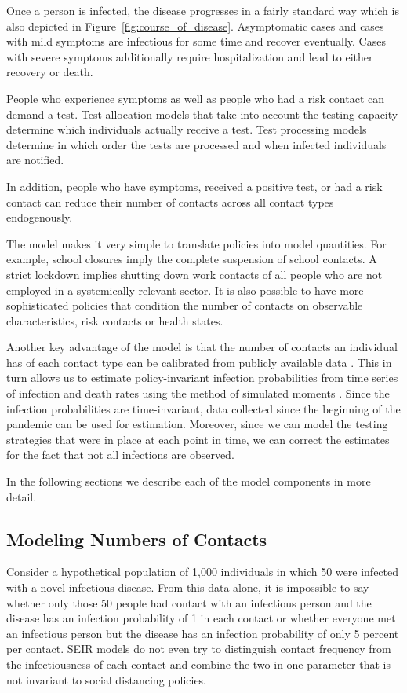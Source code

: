 Once a person is infected, the disease progresses in a fairly standard way which is also depicted in Figure~\ref{fig:course_of_disease}. Asymptomatic cases and cases with mild symptoms are infectious for some time and recover eventually. Cases with severe symptoms additionally require hospitalization and lead to either recovery or death.

People who experience symptoms as well as people who had a risk contact can demand a test. Test allocation models that take into account the testing capacity determine which individuals actually receive a test. Test processing models determine in which order the tests are processed and when infected individuals are notified.

In addition, people who have symptoms, received a positive test, or had a risk contact can reduce their number of contacts across all contact types endogenously.

The model makes it very simple to translate policies into model quantities. For example, school closures imply the complete suspension of school contacts. A strict lockdown implies shutting down work contacts of all people who are not employed in a systemically relevant sector. It is also possible to have more sophisticated policies that condition the number of contacts on observable characteristics, risk contacts or health states.

Another key advantage of the model is that the number of contacts an individual has of each contact type can be calibrated from publicly available data \citep{Mossong2008}. This in turn allows us to estimate policy-invariant infection probabilities from time series of infection and death rates using the method of simulated moments \citep{McFadden1989}. Since the infection probabilities are time-invariant, data collected since the beginning of the pandemic can be used for estimation. Moreover, since we can model the testing strategies that were in place at each point in time, we can correct the estimates for the fact that not all infections are observed.

In the following sections we describe each of the model components in more detail.

\subsection{Modeling Numbers of Contacts}
\label{sec:number_of_contacts}

Consider a hypothetical population of 1,000 individuals in which 50 were infected with a novel infectious disease. From this data alone, it is impossible to say whether only those 50 people had contact with an infectious person and the disease has an infection probability of 1 in each contact or whether everyone met an infectious person but the disease has an infection probability of only 5 percent per contact. SEIR models do not even try to distinguish contact frequency from the infectiousness of each contact and combine the two in one parameter that is not invariant to social distancing policies.

